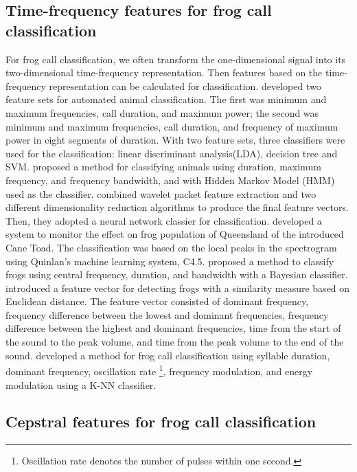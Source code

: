 \subsection{Time-frequency features for frog call classification}

For frog call classification, we often transform the one-dimensional signal into its two-dimensional time-frequency representation. Then features based on the time-frequency representation can be calculated for classification.
\cite{acevedo2009automated} developed two feature sets for automated animal classification. The first was minimum and maximum frequencies, call duration, and maximum power; the second was minimum and maximum frequencies, call duration, and frequency of maximum power in eight segments of duration. With two feature sets, three classifiers were used for the classification: linear discriminant analysis(LDA), decision tree and SVM. \cite{brandes2008feature} proposed a method for classifying animals using duration, maximum frequency, and frequency bandwidth, and with Hidden Markov Model (HMM) used as the classifier.  \cite{yen2002automatic} combined wavelet packet feature extraction and two different dimensionality reduction algorithms to produce the final feature vectors. Then, they adopted a neural network classier for classification. \cite{grigg1996monitoring} developed a system to monitor the effect on frog population of Queensland of the introduced Cane Toad. The classification was based on the local peaks in the spectrogram using Quinlan's machine learning system, C4.5. \cite{Brandes2006} proposed a method to classify frogs using central frequency, duration, and bandwidth with a Bayesian classifier. \cite{croker2012using} introduced a feature vector for detecting frogs with a similarity measure based on Euclidean distance. The feature vector consisted of dominant frequency, frequency difference between the lowest and dominant frequencies, frequency difference between the highest and dominant frequencies, time from the start of the sound to the peak volume, and time from the peak volume to the end of the sound. \cite{Xie1504:Acoustic} developed a method for frog call classification using syllable duration, dominant frequency, oscillation rate \footnote{Oscillation rate denotes the
number of pulses within one second.}, frequency modulation, and energy modulation using a K-NN classifier. 
 


\subsection{Cepstral features for frog call classification}

